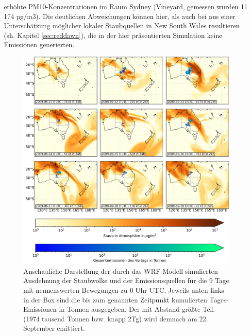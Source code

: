 \documentclass[12pt,a4paper,onecolumn,headheight=30pt]{scrartcl}
\begin{document}
erhöhte PM10-Konzentrationen im Raum Sydney (Vineyard, gemessen wurden 11 174 µg/m3). Die deutlichen Abweichungen können hier, als auch bei \citet{AlizadehChoobari.2012} aus einer Unterschätzung möglicher lokaler Staubquellen in New South Wales resultieren (sh. Kapitel \ref{sec:reddawn}), die in der hier präsentierten Simulation keine Emissionen generierten.
\begin{figure}[htbp]
\includegraphics[width=\textwidth]{bilder/dustload.png}
\caption{Anschauliche Darstellung der durch das WRF-Modell simulierten Ausdehnung der Staubwolke und der Emissionsquellen für die 9 Tage mit nennenswerten Bewegungen zu 0 Uhr UTC. Jeweils unten links in der Box sind die bis zum genannten Zeitpunkt kumulierten Tages-Emissionen in Tonnen ausgegeben. Der mit Abstand größte Teil (1974 tausend Tonnen bzw. knapp 2Tg) wird demnach am 22. September emittiert. } \label{fig:dustload}
\end{figure}
\end{document}

